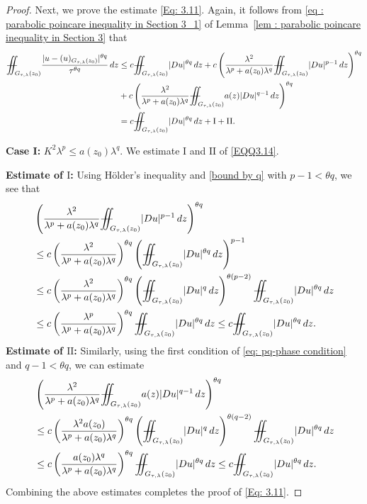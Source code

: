 \documentclass[notitlepage,11pt,reqno]{amsart}
\theoremstyle{definition}
\numberwithin{equation}{section}
\newcommand{\iintss}{{\int\hspace{-0.28cm}\int}}
\newcommand{ \miints }{{\iintss\hspace{-0.56cm} -\hspace{-0.15cm}-}}
\newcommand{\miint}[1]{{\miints_{\hspace{-0.13cm}#1}}}
\begin{document}
\begin{proof}
Next, we prove the estimate \eqref{Eq: 3.11}. Again, it follows from \eqref{eq : parabolic poincare inequality in Section 3_1} of Lemma~\ref{lem : parabolic poincare inequality in Section 3} that
\begin{align}\label{EQQ3.14}
\miint{G_{\tau, \lambda}(z_0)}\frac{|u-(u)_{G_{\tau, \lambda}(z_0)}|^{\theta q}}{\tau^{\theta q}}\,dz &\leq c\miint{G_{\tau, \lambda}(z_0)}|Du|^{\theta q}\, dz+ c\left(\frac{\lambda^2}{\lambda^p+a(z_0)\lambda^q}\miint{G_{\tau, \lambda}(z_0)}|Du|^{p-1}\,dz\right)^{\theta q}\nonumber\\
&+c\left(\frac{\lambda^2}{\lambda^p+a(z_0)\lambda^q}\miint{G_{\tau, \lambda}(z_0)}a(z)|Du|^{q-1}\,dz\right)^{\theta q}\nonumber\\
&=c\miint{G_{\tau, \lambda}(z_0)}|Du|^{\theta q}\, dz+\mathrm{I}+\mathrm{II}.
\end{align}

\noindent \textbf{Case I:} $K^2\lambda^p\leq a(z_0)\lambda^q$. We estimate $\mathrm{I}$ and $\mathrm{II}$ of \eqref{EQQ3.14}.

\noindent \textbf{Estimate of $\mathrm{I}$:} Using H\"{o}lder's inequality and \eqref{bound by q} with $p-1<\theta q$, we see that
\begin{align*}
&\left(\frac{\lambda^2}{\lambda^p+a(z_0)\lambda^q}\miint{G_{\tau, \lambda}(z_0)}|Du|^{p-1}\,dz\right)^{\theta q}\\
&\leq c\left(\frac{\lambda^2}{\lambda^p+a(z_0)\lambda^q}\right)^{\theta q}\left(\miint{G_{\tau, \lambda}(z_0)}|Du|^{\theta q}\,dz\right)^{p-1}\\
&\leq c \left(\frac{\lambda^2}{\lambda^p+a(z_0)\lambda^q}\right)^{\theta q}\left(\miint{G_{\tau, \lambda}(z_0)}|Du|^q\, dz\right)^{\theta(p-2)} \miint{G_{\tau, \lambda}(z_0)}|Du|^{\theta q}\, dz\\
&\leq c\left(\frac{\lambda^p}{\lambda^p+a(z_0)\lambda^q}\right)^{\theta q} \miint{G_{\tau, \lambda}(z_0)}|Du|^{\theta q}\, dz\leq c \miint{G_{\tau, \lambda}(z_0)}|Du|^{\theta q}\, dz.
\end{align*}
\textbf{Estimate of $\mathrm{II}$:} Similarly,  using the first condition of \eqref{eq: pq-phase condition} and $q-1<\theta q$, we can estimate
\begin{align*}
&\left(\frac{\lambda^2}{\lambda^p+a(z_0)\lambda^q}\miint{G_{\tau, \lambda}(z_0)}a(z)|Du|^{q-1}\,dz\right)^{\theta q}\\
&\leq c\left(\frac{\lambda^2 a(z_0)}{\lambda^p+a(z_0)\lambda^q}\right)^{\theta q}\left(\miint{G_{\tau, \lambda}(z_0)}|Du|^q\,dz\right)^{\theta (q-2)} \miint{G_{\tau, \lambda}(z_0)}|Du|^{\theta q}\,dz\\
&\leq c \left(\frac{a(z_0)\lambda^q}{\lambda^p+a(z_0)\lambda^q}\right)^{\theta q} \miint{G_{\tau, \lambda}(z_0)}|Du|^{\theta q}\,dz\leq c \miint{G_{\tau, \lambda}(z_0)}|Du|^{\theta q}\,dz.
\end{align*}
Combining the above estimates completes the proof of \eqref{Eq: 3.11}.




\end{proof}
\end{document}
